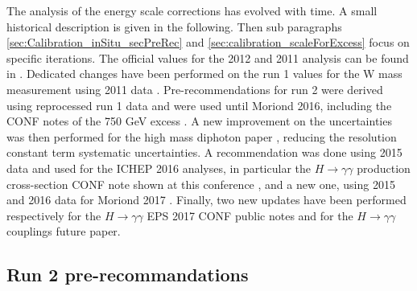 The analysis of the energy scale corrections has evolved with time.
A small historical description is given in the following.
Then sub paragraphs \ref{sec:Calibration_inSitu_secPreRec} and \ref{sec:calibration_scaleForExcess} focus on specific iterations.
The official values for the 2012 and 2011 analysis can be found in \cite{CERN-PH-EP-2014-153,ATL-COM-PHYS-2013-1653}.
Dedicated changes have been performed on the run 1 values for the W mass measurement \cite{CERN-EP-2016-305} using 2011 data \cite{ATL-COM-PHYS-2014-1434}.
Pre-recommendations for run 2 were derived \cite{ATL-PHYS-PUB-2016-015,ATL-COM-PHYS-2015-1300} using reprocessed run 1 data and were used until Moriond 2016, including the CONF notes of the 750 GeV excess \cite{ATLAS-CONF-2016-018,ATLAS-CONF-2015-081}.
A new improvement on the uncertainties was then performed \cite{ATL-COM-PHYS-2016-184,ATL-COM-PHYS-2016-437} for the high mass diphoton paper \cite{CERN-EP-2016-120}, reducing the resolution constant term systematic uncertainties.
A recommendation was done using 2015 data \cite{ATL-PHYS-PUB-2016-015} and used for the ICHEP 2016 analyses, in particular the \(H\rightarrow\gamma\gamma\) production cross-section CONF note shown at this conference \cite{ATLAS-COM-CONF-2016-068},  and a new one, using 2015 and 2016 data for Moriond 2017 \cite{MoriondCalib}.
Finally, two new updates \cite{ATL-COM-PHYS-2017-757,EPSCalib} have been performed respectively for the \(H\rightarrow\gamma\gamma\) EPS 2017 CONF \cite{ATLAS-CONF-2017-045,ATLAS-COM-CONF-2017-054,ATLAS-CONF-2017-046} public notes and for the $H\rightarrow\gamma\gamma$ couplings future paper.


\subsection{Run 2 pre-recommandations}
\label{sec:org6c03620}

